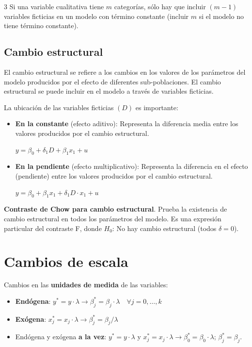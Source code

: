 \documentclass[10pt, a4paper, landscape]{article}
\begin{document}
\begin{multicols}{3}
Si una variable cualitativa tiene \( m \) categorías, sólo hay que incluir \( (m - 1) \) variables ficticias en un modelo con término constante (incluir \( m \) si el modelo no tiene término constante).

\subsection*{Cambio estructural}

El cambio estructural se refiere a los cambios en los valores de los parámetros del modelo producidos por el efecto de diferentes sub-poblaciones. El cambio estructural se puede incluir en el modelo a través de variables ficticias.

La ubicación de las variables ficticias \( (D) \) es importante:

\begin{itemize}[leftmargin=*]
	\item \textbf{En la constante} (efecto aditivo): Representa la diferencia media entre los valores producidos por el cambio estructural.
	\begin{center}
		\( y = \beta_{0} + \delta_{1} D + \beta_{1} x_{1} + u \)
	\end{center}
	\item \textbf{En la pendiente} (efecto multiplicativo): Representa la diferencia en el efecto (pendiente) entre los valores producidos por el cambio estructural.
	\begin{center}
		\( y = \beta_{0} + \beta_{1} x_{1} + \delta_{1} D \cdot x_{1} + u \)
	\end{center}
\end{itemize}

\textbf{Contraste de Chow para cambio estructural}. Prueba la existencia de cambio estructural en todos los parámetros del modelo. Es una expresión particular del contraste F, donde \( H_{0} \): No hay cambio estructural (todos \( \delta = 0 \)).

\section*{Cambios de escala}

Cambios en las \textbf{unidades de medida} de las variables:

\begin{itemize}[leftmargin=*]
	\item \textbf{Endógena}: \( y^{*} = y \cdot \lambda \rightarrow \beta_{j}^{*} = \beta_{j} \cdot \lambda \quad \forall j = 0, \ldots, k \)
	\item \textbf{Exógena}: \( x_{j}^{*} = x_{j} \cdot \lambda \rightarrow \beta_{j}^{*} = \beta_{j} / \lambda \)
	\item Endógena y exógena \textbf{a la vez}: \( y^{*} = y \cdot \lambda \) y \( x_{j}^{*} = x_{j} \cdot \lambda \rightarrow \beta_{0}^{*} = \beta_{0} \cdot \lambda \); \( \beta_{j}^{*} = \beta_{j} \).
\end{itemize}


\end{multicols}
\end{document}
